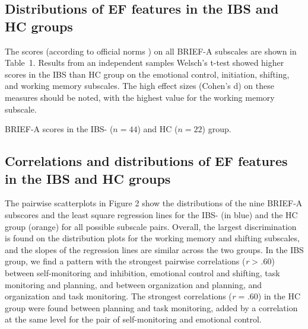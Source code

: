 \documentclass[jcm,article,submit,pdftex,moreauthors]{Definitions/mdpi}
\begin{document}
\subsection{Distributions of EF features in the IBS and HC groups} 
The scores (according to official norms \cite{roth2005manual}) on all BRIEF-A subscales are shown in Table~1. 
Results from an independent samples Welsch's t-test showed higher scores in the IBS than HC group on the emotional control, initiation, shifting, and working memory subscales. The high effect sizes (Cohen's d) on these measures should be noted, with the highest value for the working memory subscale.


\begin{table}[H]
\begin{center}
 
\caption{BRIEF-A scores in the IBS- ($n=44$) and HC ($n=22$) group.}
\end{center}
\end{table}









\subsection{Correlations and distributions of EF features in the IBS and HC groups} 



The pairwise scatterplots in Figure 2 show the distributions of the nine BRIEF-A subscores and the least square regression lines for the IBS- (in blue) and the HC group (orange) for all possible subscale pairs. Overall, the largest discrimination is found on the distribution plots for the working memory and shifting subscales, and the slopes of the regression lines are similar across the two groups.  In the IBS group, we find a pattern with the strongest pairwise correlations (\emph{r} > .60) between self-monitoring and inhibition, emotional control and shifting, task monitoring and planning, and between organization and planning, and organization and task monitoring. The strongest correlations (\emph{r} = .60) in the HC group were found between planning and task monitoring, added by a correlation at the same level for the pair of self-monitoring and emotional control. 
\end{document}
